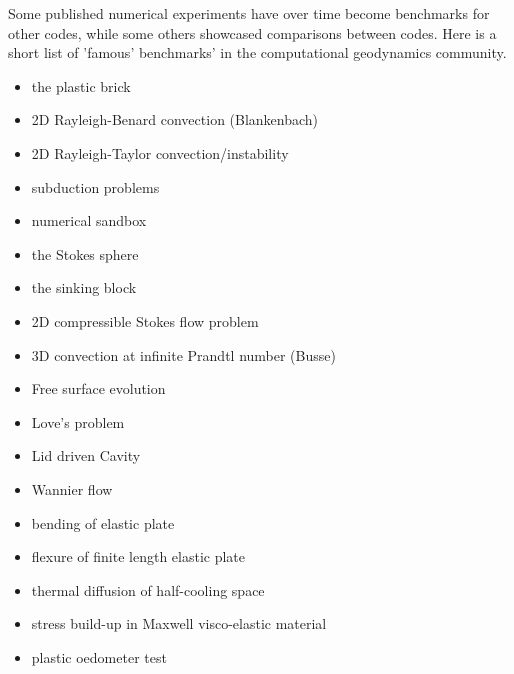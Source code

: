 Some published numerical experiments have over time become benchmarks for other codes, while some 
others showcased comparisons between codes. Here is a short list of 'famous' benchmarks' in the 
computational geodynamics community.

\begin{itemize}
\item the plastic brick \cite{lemm08,kaus10,qurj09}
\item 2D Rayleigh-Benard convection (Blankenbach)  \cite{blbc89,trha98,chhl08,king09,lezh11,vyrc13,trab90}
\item 2D Rayleigh-Taylor convection/instability \cite{pros81,trab90,soga01,bast02,taki03,bomh06, basd08,qurj09,saev10,lezh11,vyrc13,vkks97,bomh06,chtl13} 
\item subduction problems \cite{scbe08,vack08,cehg14}
\item numerical sandbox \cite{bbeg06,busa16}
\item the Stokes sphere \cite{galemanual}
\item the sinking block \cite{thie11,cehg14,gery10,geyu03}
\item 2D compressible Stokes flow problem \cite{lezh08}
\item 3D convection at infinite Prandtl number (Busse) \cite{bucc93,trha98}
\item Free surface evolution \cite{crsg12}
\item Love's problem \cite{bebe04}
\item Lid driven Cavity \cite{bope98}
\item Wannier flow \cite{wann50,yemu99}
\item bending of elastic plate \cite{cehg14,boht08a}
\item flexure of finite length elastic plate \cite{chtl13}
\item thermal diffusion of half-cooling space \cite{chtl13}
\item stress build-up in Maxwell visco-elastic material \cite{geyu07,chtl13}
\item plastic oedometer test  \cite{chtl13}
\end{itemize}

